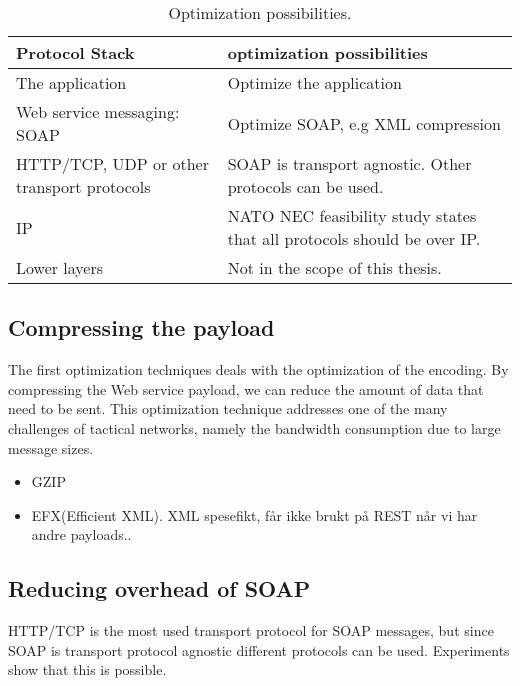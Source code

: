 \begin{table}[h]
\begin{tabularx}{\textwidth}{| X | X |}
\hline
  \textbf{Protocol Stack} & \textbf{optimization possibilities} \\ \hline
  The application & Optimize the application\\ \hline
  Web service messaging: SOAP & Optimize SOAP, e.g XML compression \\ \hline
  HTTP/TCP, UDP or other transport protocols & SOAP is transport agnostic. Other
  protocols can be used. \\ \hline
  IP & NATO NEC feasibility study states that all protocols should be over IP. \\
  \hline
  Lower layers & Not in the scope of this thesis. \\ \hline
\end{tabularx}
\caption{Optimization possibilities.} \label{table:optimalization-overview}
\end{table}


\subsection{Compressing the payload}

The first optimization techniques deals with the optimization of the encoding.
By compressing the Web service payload, we can reduce the amount of data that
need to be sent. This optimization technique addresses one of the many
challenges of tactical networks, namely the bandwidth consumption due to large
message sizes.

\begin{itemize}
\item GZIP

\item EFX(Efficient XML). XML spesefikt, får ikke brukt på REST når vi har andre
payloads..

\end{itemize}

\subsection{Reducing overhead of SOAP}
HTTP/TCP is the most used transport protocol for SOAP messages, but since SOAP is transport protocol agnostic different protocols can be used. Experiments show that this is possible.


